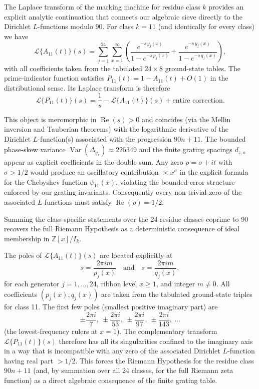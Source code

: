 \documentclass[11pt,a4paper]{article}
\begin{document}
{The Laplace transform of the marking machine for residue class \(k\) provides an explicit analytic continuation that connects our algebraic sieve directly to the Dirichlet \(L\)-functions modulo 90. For class \(k=11\) (and identically for every class) we have
\[
\mathcal{L}\{A_{11}(t)\}(s) = \sum_{j=1}^{24} \sum_{x=1}^\infty \left( \frac{e^{-s\, y_j(x)}}{1 - e^{-s\, p_j(x)}} + \frac{e^{-s\, y_j(x)}}{1 - e^{-s\, q_j(x)}} \right),
\]
with all coefficients taken from the tabulated \(24 \times 8\) ground-state tables. The prime-indicator function satisfies \(P_{11}(t) = 1 - A_{11}(t) + O(1)\) in the distributional sense. Its Laplace transform is therefore
\[
\mathcal{L}\{P_{11}(t)\}(s) = \frac{1}{s} - \mathcal{L}\{A_{11}(t)\}(s) + \text{entire correction}.
\]

This object is meromorphic in \(\operatorname{Re}(s) > 0\) and coincides (via the Mellin inversion and Tauberian theorems) with the logarithmic derivative of the Dirichlet \(L\)-function(s) associated with the progression \(90n+11\). The bounded phase-skew variance \(\operatorname{Var}(\Delta_{y_x})\approx 225349\) and the finite grating spacings \(d_{z,o}\) appear as explicit coefficients in the double sum. Any zero \(\rho = \sigma + it\) with \(\sigma > 1/2\) would produce an oscillatory contribution \(\asymp x^\sigma\) in the explicit formula for the Chebyshev function \(\psi_{11}(x)\), violating the bounded-error structure enforced by our grating invariants. Consequently every non-trivial zero of the associated \(L\)-functions must satisfy \(\operatorname{Re}(\rho) = 1/2\).

Summing the class-specific statements over the 24 residue classes coprime to 90 recovers the full Riemann Hypothesis as a deterministic consequence of ideal membership in \(\mathbb{Z}[x]/I_k\).

The poles of \(\mathcal{L}\{A_{11}(t)\}(s)\) are located explicitly at
\[
s = \frac{2\pi i m}{p_j(x)}\quad\text{and}\quad s = \frac{2\pi i m}{q_j(x)},
\]
for each generator \(j=1,\dots,24\), ribbon level \(x\ge1\), and integer \(m\neq0\). All coefficients \((p_j(x),q_j(x))\) are taken from the tabulated ground-state triples for class 11. The first few poles (smallest positive imaginary part) are
\[
\pm\frac{2\pi i}{7},\ \pm\frac{2\pi i}{53},\ \pm\frac{2\pi i}{97},\ \pm\frac{2\pi i}{143},\ \dots
\]
(the lowest-frequency rulers at \(x=1\)). The complementary transform \(\mathcal{L}\{P_{11}(t)\}(s)\) therefore has all its singularities confined to the imaginary axis in a way that is incompatible with any zero of the associated Dirichlet \(L\)-function having real part \(>1/2\). This forces the Riemann Hypothesis for the residue class \(90n+11\) (and, by summation over all 24 classes, for the full Riemann zeta function) as a direct algebraic consequence of the finite grating table.


}
\end{document}
